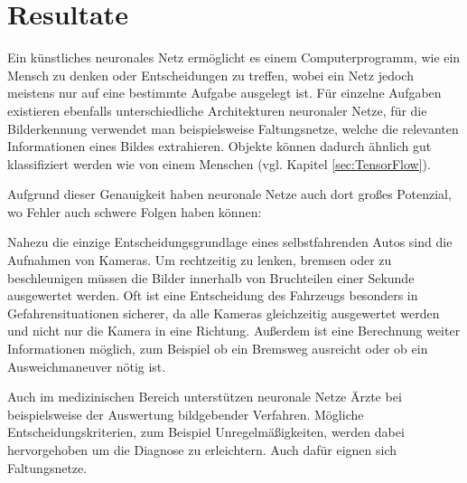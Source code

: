 \documentclass[12pt,a4]{article}
\begin{document}
\section{Resultate}
Ein künstliches neuronales Netz ermöglicht es einem Computerprogramm, wie ein Mensch zu denken oder Entscheidungen zu treffen, wobei ein Netz jedoch meistens nur auf eine bestimmte Aufgabe ausgelegt ist. Für einzelne Aufgaben existieren ebenfalls unterschiedliche Architekturen neuronaler Netze, für die Bilderkennung verwendet man beispielsweise Faltungsnetze, welche die relevanten Informationen eines Bildes extrahieren. Objekte können dadurch ähnlich gut klassifiziert werden wie von einem Menschen (vgl. Kapitel \ref{sec:TensorFlow}).

Aufgrund dieser Genauigkeit haben neuronale Netze auch dort großes Potenzial, wo Fehler auch schwere Folgen haben können:

Nahezu die einzige Entscheidungsgrundlage eines selbstfahrenden Autos sind die Aufnahmen von Kameras. Um rechtzeitig zu lenken, bremsen oder zu beschleunigen müssen die Bilder innerhalb von Bruchteilen einer Sekunde ausgewertet werden. Oft ist eine Entscheidung des Fahrzeugs besonders in Gefahrensituationen sicherer, da alle Kameras gleichzeitig ausgewertet werden und nicht nur die Kamera in eine Richtung. Außerdem ist eine Berechnung weiter Informationen möglich, zum Beispiel ob ein Bremsweg ausreicht oder ob ein Ausweichmaneuver nötig ist.

Auch im medizinischen Bereich unterstützen neuronale Netze Ärzte bei beispielsweise der Auswertung bildgebender Verfahren. Mögliche Entscheidungskriterien, zum Beispiel Unregelmäßigkeiten, werden dabei hervorgehoben um die Diagnose zu erleichtern. Auch dafür eignen sich Faltungsnetze. \cite{HelpInMedicine}



\end{document}
